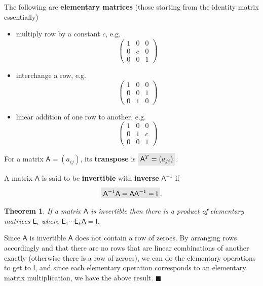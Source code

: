 \documentclass[letter-paper]{tufte-book}
\newtheorem{theorem}{\color{pastel-blue}Theorem}[section]
\newenvironment{proof}[1][Proof]{\begin{trivlist}
\item[\hskip \labelsep {\bfseries #1}]}{\end{trivlist}}
\newcommand{\As}{{\mathsf{A}}}
\newcommand{\Is}{{\mathsf{I}}}
\newcommand{\qed}{\hfill$\blacksquare$}
\newcommand{\highlight}[1]{\mathchoice%
  {\colorbox{black!10}{$\displaystyle#1$}}%
  {\colorbox{black!10}{$\textstyle#1$}}%
  {\colorbox{black!10}{$\scriptstyle#1$}}%
  {\colorbox{black!10}{$\scriptscriptstyle#1$}}}%
\begin{document}
The following are \textbf{elementary matrices} (those starting from the identity matrix essentially)
\begin{itemize}
  \item multiply row by a constant $c$, e.g.
  \begin{equation*}
    \begin{pmatrix} 1 & 0 & 0 \\ 0 & c & 0 \\ 0 & 0 & 1\end{pmatrix}
  \end{equation*}
  
  \item interchange a row, e.g.
  \begin{equation*}
    \begin{pmatrix} 1 & 0 & 0 \\ 0 & 0 & 1 \\ 0 & 1 & 0\end{pmatrix}
  \end{equation*}
  
  \item linear addition of one row to another, e.g.
  \begin{equation*}
    \begin{pmatrix} 1 & 0 & 0 \\ 0 & 1 & c \\ 0 & 0 & 1\end{pmatrix}
  \end{equation*}
\end{itemize}

For a matrix $\As = (a_{ij})$, its \textbf{transpose} is $\highlight{\As^T = (a_{ji})}$.

A matrix $\As$ is said to be \textbf{invertible} with \textbf{inverse} $\As^{-1}$ if
\begin{equation}
  \highlight{\As^{-1} \As = \As \As^{-1} = \Is}.
\end{equation}

\begin{theorem}
  If a matrix $\As$ is invertible then there is a product of elementary matrices $\mathsf{E}_i$ where $\mathsf{E}_1 \cdots \mathsf{E}_k \As = \Is$.\marginnote{So then $\As^{-1} = \mathsf{E}_1 \cdots \mathsf{E}_k$.}
\end{theorem}

\begin{proof}
  Since $\As$ is invertible $\As$ does not contain a row of zeroes. By arranging rows accordingly and that there are no rows that are linear combinations of another exactly (otherwise there is a row of zeroes), we can do the elementary operations to get to $\Is$, and since each elementary operation corresponds to an elementary matrix multiplication, we have the above result. \qed
\end{proof}
\end{document}
